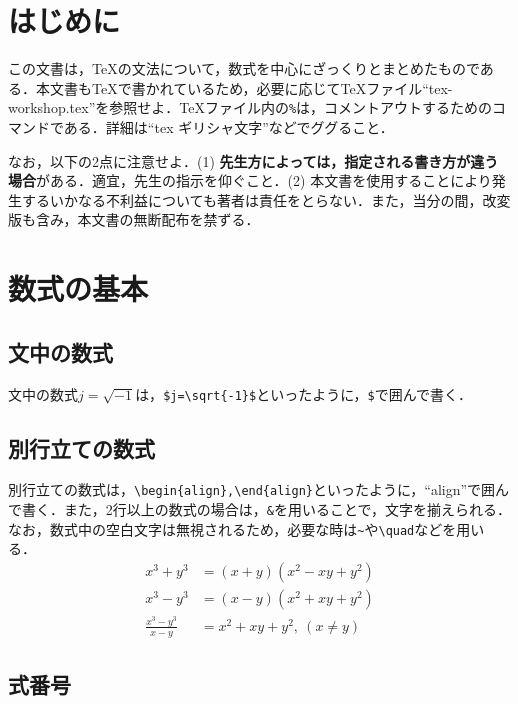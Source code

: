 \documentclass[11pt,a4paper]{jsarticle}
\begin{document}
%
%
\section{はじめに}

この文書は，\TeX の文法について，数式を中心にざっくりとまとめたものである．本文書も\TeX で書かれているため，必要に応じて\TeX ファイル``tex-workshop.tex''を参照せよ．TeXファイル内の\verb|%|は，コメントアウトするためのコマンドである．詳細は``tex ギリシャ文字''などでググること．

なお，以下の2点に注意せよ．(1) \textbf{先生方によっては，指定される書き方が違う場合}がある．適宜，先生の指示を仰ぐこと．(2) 本文書を使用することにより発生するいかなる不利益についても著者は責任をとらない．また，当分の間，改変版も含み，本文書の無断配布を禁ずる．

\section{数式の基本}

\subsection{文中の数式}

文中の数式$j=\sqrt{-1}$は，\verb|$j=\sqrt{-1}$|といったように，\verb|$|で囲んで書く．

\subsection{別行立ての数式}

別行立ての数式は，\verb|\begin{align},\end{align}|といったように，``align''で囲んで書く．また，2行以上の数式の場合は，\verb|&|を用いることで，文字を揃えられる．なお，数式中の空白文字は無視されるため，必要な時は\verb|~|や\verb|\quad|などを用いる．
\begin{align}
  x^3+y^3             & =(x+y)\left(x^2-xy+y^2\right) \label{factorization-1} \\
  x^3-y^3             & =(x-y)\left(x^2+xy+y^2\right) \label{factorization-2} \\
  \frac{x^3-y^3}{x-y} & =x^2+xy+y^2,~(x\neq y) \label{factorization-3}
\end{align}

\subsection{式番号}
\end{document}
